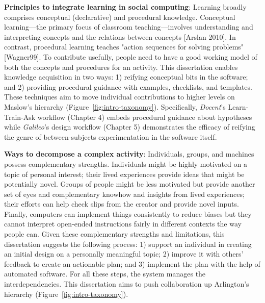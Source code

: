 \textbf{Principles to integrate learning in social computing}: Learning broadly comprises conceptual (declarative) and procedural knowledge. Conceptual learning---the primary focus of classroom teaching---involves understanding and interpreting concepts and the relations between concepts [Arslan 2010]. In contrast, procedural learning teaches "action sequences for solving problems" [Wagner99]. To contribute usefully, people need to have a good working model of both the concepts and procedures for an activity. This dissertation enables knowledge acquisition in two ways: 1) reifying conceptual bits in the software; and 2) providing procedural guidance with examples, checklists, and templates. These techniques aim to move individual contributions to higher levels on Maslow's hierarchy (Figure~\ref{fig:intro-taxonomy}). 
Specifically, \textit{Docent}'s Learn-Train-Ask workflow (Chapter 4) embeds procedural guidance about hypotheses while \textit{Galileo}'s design workflow (Chapter 5) demonstrates the efficacy of reifying the genre of between-subjects experimentation in the software itself.

\textbf{Ways to decompose a complex activity}: 
Individuals, groups, and machines possess complementary strengths. Individuals might be highly motivated on a topic of personal interest; their lived experiences provide ideas that might be potentially novel. Groups of people might be less motivated but provide another set of eyes and complementary knowhow and insights from lived experiences; their efforts can help check slips from the creator and provide novel inputs. Finally, computers can implement things consistently to reduce biases but they cannot interpret open-ended instructions fairly in different contexts the way people can. Given these complementary strengths and limitations, this dissertation suggests the following process: 1) support an individual in creating an initial design on a personally meaningful topic; 2) improve it with others' feedback to create an actionable plan; and 3) implement the plan with the help of automated software. For all these steps, the system manages the interdependencies. This dissertation aims to push collaboration up Arlington's hierarchy (Figure~\ref{fig:intro-taxonomy}). 

